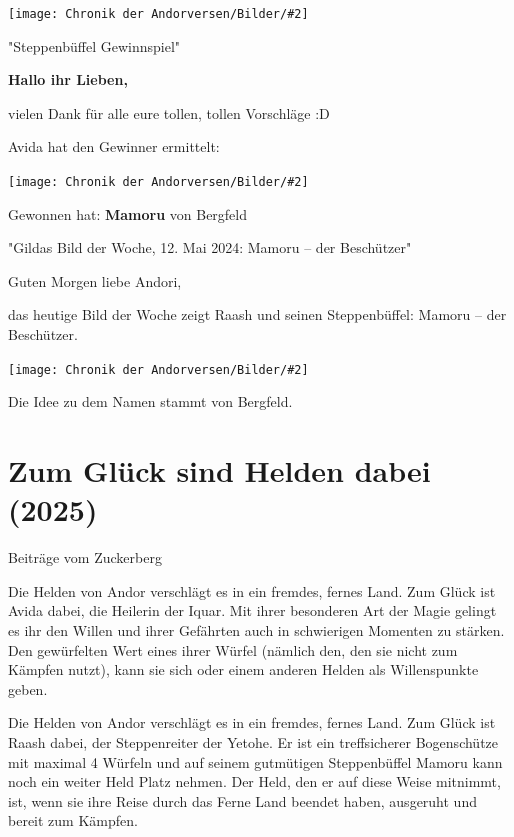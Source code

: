 \documentclass[10pt, a4paper, oneside]{book}
\newcommand{\storytext}[1]{%
    \section{#1}%
    \label{Storytext: #1}%
}
\newcommand{\bildmitts}[2][height=0.32\textwidth,width=0.48\textwidth,keepaspectratio]{%
    \begin{center}
        \texttt{[image: Chronik der Andorversen/Bilder/\#2]}
    \end{center}
}
\begin{document}
\begin{multicols}{2}
\bildmitts{Die Bezwingerin des Feuers 5.jpeg}




\begin{center}
    "Steppenbüffel Gewinnspiel"
\end{center}

\textbf{Hallo ihr Lieben,}

vielen Dank für alle eure tollen, tollen Vorschläge :D

Avida hat den Gewinner ermittelt:

\bildmitts{Die Bezwingerin des Feuers 6.jpeg}

Gewonnen hat: \textbf{Mamoru} von Bergfeld





\begin{center}
    "Gildas Bild der Woche, 12. Mai 2024: Mamoru – der Beschützer"
\end{center}

Guten Morgen liebe Andori,

das heutige Bild der Woche zeigt Raash und seinen Steppenbüffel: Mamoru – der Beschützer.

\bildmitts{Die Bezwingerin des Feuers 7.jpeg}

Die Idee zu dem Namen stammt von Bergfeld.





\storytext{Zum Glück sind Helden dabei (2025)}

\begin{center}
    Beiträge vom Zuckerberg
\end{center}

Die Helden von Andor verschlägt es in ein fremdes, fernes Land. Zum Glück ist Avida dabei, die Heilerin der Iquar. Mit ihrer besonderen Art der Magie gelingt es ihr den Willen und ihrer Gefährten auch in schwierigen Momenten zu stärken. Den gewürfelten Wert eines ihrer Würfel (nämlich den, den sie nicht zum Kämpfen nutzt), kann sie sich oder einem anderen Helden als Willenspunkte geben.\bigskip

Die Helden von Andor verschlägt es in ein fremdes, fernes Land. Zum Glück ist Raash dabei, der Steppenreiter der Yetohe. Er ist ein treffsicherer Bogenschütze mit maximal 4 Würfeln und auf seinem gutmütigen Steppenbüffel Mamoru kann noch ein weiter Held Platz nehmen. Der Held, den er auf diese Weise mitnimmt, ist, wenn sie ihre Reise durch das Ferne Land beendet haben, ausgeruht und bereit zum Kämpfen. \bigskip


\end{multicols}
\end{document}
